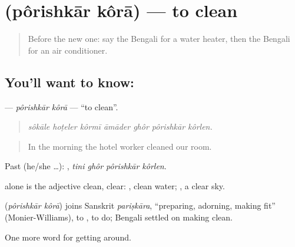 \section[\texorpdfstring{\bn{পরিষ্কার} \bn{করা} (pôrishkār kôrā)}{পরিষ্কার করা (pôrishkār kôrā)}]{  (pôrishkār kôrā) — to clean}

\label{lesson:BN-C405-porishkar-kora}



\begin{quote}
Before the new one: say the Bengali for a water heater, then the Bengali for an air conditioner.
\end{quote}

\subsection*{You'll want to know:  }
\textbf{ } — \emph{pôrishkār kôrā} — \textquotedblleft{}to clean\textquotedblright{}.

\begin{quote}
      
\end{quote}

\begin{quote}
\emph{sôkāle hoṭeler kôrmī āmāder ghôr pôrishkār kôrlen.}
\end{quote}

\begin{quote}
In the morning the hotel worker cleaned our room.
\end{quote}

Past (he/she …):    , \emph{tini ghôr pôrishkār kôrlen}.

 alone is the adjective clean, clear:  , clean water;  , a clear sky.

\begin{cousinweb}
\textbf{ } (\emph{pôrishkār kôrā}) joins Sanskrit \emph{pariṣkāra}, \textquotedblleft{}preparing, adorning, making fit\textquotedblright{} (Monier-Williams), to , to do; Bengali settled on making clean.
\end{cousinweb}

\begin{grammarlens}[title={What you've built}]
One more word for getting around.
\end{grammarlens}

